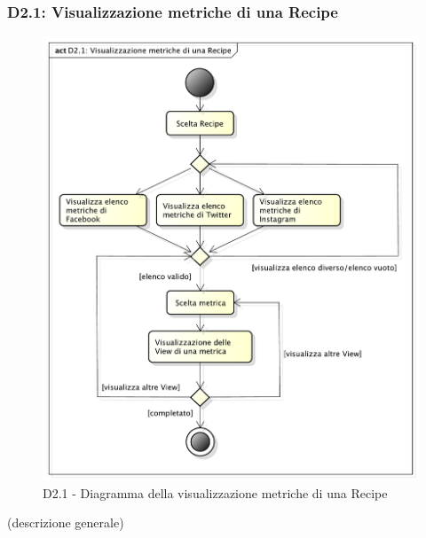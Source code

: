 		\subsubsection{D2.1: Visualizzazione metriche di una Recipe} %
		\label{ssub:visualizzazione_metriche_di_una_recipe}
		\label{ssub:registrazione_al_sistema}
		\begin{figure}[!htbp]
			\centering
			\centerline{\includegraphics[scale=0.45]{./images/D2_1.pdf}}
			\caption{D2.1 - Diagramma della visualizzazione metriche di una Recipe}
		\end{figure}
		\noindent
		[TO DO] (descrizione generale)


